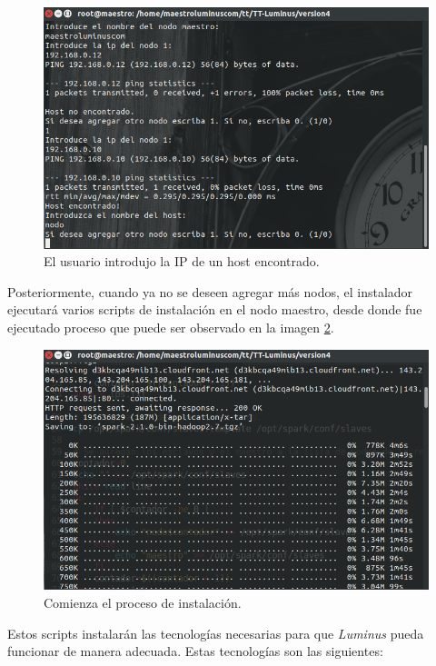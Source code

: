 \begin{figure}[H]
	\hypertarget{fig:hostencontrado}{\hspace{1pt}}
	\begin{center}	
		\includegraphics[width=.7\textwidth]{capitulo5/images/hostencontrado.png}
		\caption{El usuario introdujo la IP de un host encontrado.}
	\end{center}
	\label{fig:hostencontrado}
\end{figure}

Posteriormente, cuando ya no se deseen agregar más nodos, el instalador ejecutará varios scripts de instalación en el nodo maestro, desde donde fue ejecutado proceso que puede ser observado en la imagen \ref{fig:instalacion}.\\

\begin{figure}[H]
	\hypertarget{fig:instalacion}{\hspace{1pt}}
	\begin{center}	
		\includegraphics[width=.7\textwidth]{capitulo5/images/instalacion.png}
		\caption{Comienza el proceso de instalación.}
	\end{center}
	\label{fig:instalacion}
\end{figure}

Estos scripts instalarán las tecnologías necesarias para que \emph{Luminus} pueda funcionar de manera adecuada. Estas tecnologías son las siguientes:\\

